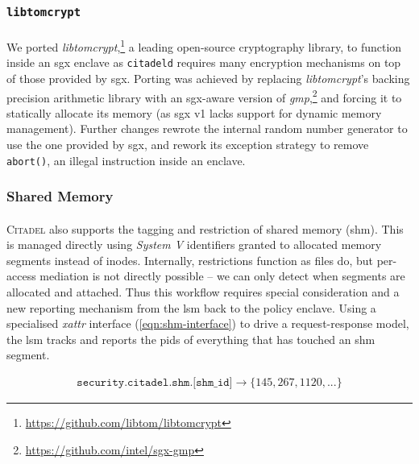 \subsubsection{\texttt{libtomcrypt}}
\paragraph{} We ported \textit{libtomcrypt},\footnote{\url{https://github.com/libtom/libtomcrypt}} a leading open-source cryptography library, to function inside an \acrshort{sgx} enclave as \texttt{citadeld} requires many encryption mechanisms on top of those provided by \acrshort{sgx}. Porting was achieved by replacing \textit{libtomcrypt}'s backing precision arithmetic library with an \acrshort{sgx}-aware version of \textit{\acrshort{gmp}},\footnote{\url{https://github.com/intel/sgx-gmp}} and forcing it to statically allocate its memory (as \acrshort{sgx} v1 lacks support for dynamic memory management). Further changes rewrote the internal random number generator to use the one provided by \acrshort{sgx}, and rework its exception strategy to remove \texttt{abort()}, an illegal instruction inside an enclave.

\subsubsection{Shared Memory}
\label{sec:shm}
\paragraph{} \textsc{Citadel} also supports the tagging and restriction of shared memory (\acrshort{shm}). This is managed directly using \textit{System V} identifiers granted to allocated memory segments instead of inodes. Internally, restrictions function as files do, but per-access mediation is not directly possible -- we can only detect when segments are allocated and attached. Thus this workflow requires special consideration and a new reporting mechanism from the \acrshort{lsm} back to the policy enclave. Using a specialised \textit{\acrshort{xattr}} interface (\ref{eqn:shm-interface}) to drive a request-response model, the \acrshort{lsm} tracks and reports the \acrshort{pid}s of everything that has touched an \acrshort{shm} segment. 

\vspace{-8mm}
\begin{align}
    \texttt{security.citadel.shm.[shm\_id]} \longrightarrow \{145, 267, 1120, ...\} \label{eqn:shm-interface}
\end{align}

